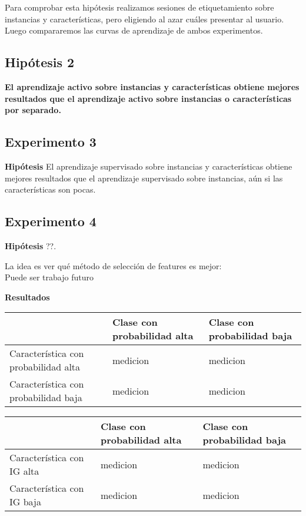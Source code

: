 Para comprobar esta hipótesis realizamos sesiones de etiquetamiento sobre instancias y características, pero eligiendo al azar cuáles presentar al usuario. Luego compararemos las curvas de aprendizaje de ambos experimentos.

\subsection{Hipótesis 2}
\textbf{El aprendizaje activo sobre instancias y características obtiene mejores resultados que el aprendizaje activo sobre instancias o características por separado.}



\subsection{Experimento 3}
\textbf{Hipótesis} El aprendizaje supervisado sobre instancias y características obtiene mejores resultados que el aprendizaje supervisado sobre instancias, aún si las características son pocas.


\subsection{Experimento 4}
\textbf{Hipótesis} ??.

La idea es ver qué método de selección de features es mejor:\\

Puede ser trabajo futuro



\textbf{Resultados}\\

\begin{tabular}{||p{4cm} | l | l||}
\hline
 & Clase con probabilidad alta & Clase con probabilidad baja \\
\hline
Característica con probabilidad alta & medicion & medicion \\
\hline
Característica con probabilidad baja & medicion & medicion \\
\hline
\end{tabular}
\hfill
\begin{tabular}{||p{4cm} | l | l||}
\hline
 & Clase con probabilidad alta & Clase con probabilidad baja \\
\hline
Característica con IG alta & medicion & medicion \\
\hline
Característica con IG baja & medicion & medicion \\
\hline

\end{tabular}



